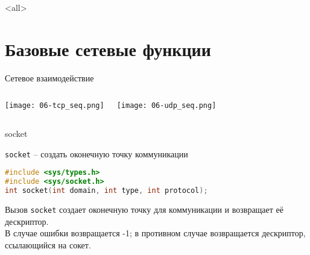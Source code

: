 

\subtitle{Программный интерфейс взаимодействия сокетов Беркли\\(продолжение)}



\mode<all>{}

%
%

\section{Базовые сетевые функции}
\begin{frame}{Сетевое взаимодействие}
	\begin{columns}
	\begin{center}
		\texttt{[image: 06-tcp\_seq.png]}
	\end{center}
	\begin{center}
		\texttt{[image: 06-udp\_seq.png]}
	\end{center}

\end{columns}
\end{frame}

\begin{frame}[fragile]{socket}

{\tt socket} -- создать оконечную точку коммуникации   

\scriptsize\begin{lstlisting}[language=C]
#include <sys/types.h> 
#include <sys/socket.h> 
int socket(int domain, int type, int protocol);   
\end{lstlisting}

Вызов {\tt socket} создает оконечную точку для коммуникации и возвращает её дескриптор.\\
В случае ошибки возвращается -1; в противном случае возвращается дескриптор, ссылающийся на сокет. 
\end{frame}


